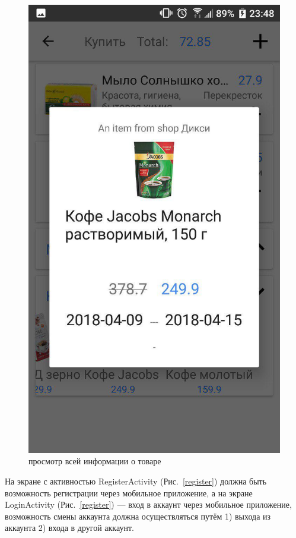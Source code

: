 \begin{figure}[h!]
    \includegraphics[height=0.38\textheight]{./screenshots/3/full_item_preview.jpg}
    \caption{\small{просмотр всей информации о товаре}}
    \endminipage{}
\end{figure}

На экране с активностью RegisterActivity (Рис.~\ref{register}) должна быть возможность регистрации
через мобильное приложение, а на экране LoginActivity (Рис.~\ref{register}) --- вход в аккаунт через
мобильное приложение, возможность смены аккаунта должна осуществляться путём 1) выхода из аккаунта 2) входа в другой аккаунт.

